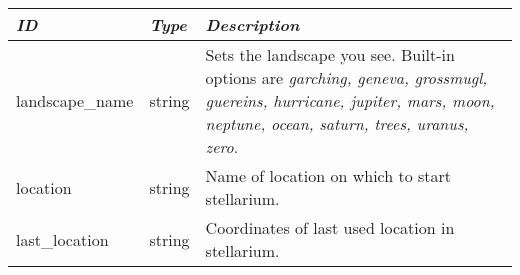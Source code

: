 \begin{longtabu} to \textwidth {l|l|X}\toprule
\emph{ID} & \emph{Type} & \emph{Description}\\\midrule
landscape\_name   & string & Sets the landscape you see. Built-in options are \emph{garching, geneva, grossmugl, guereins, 
                             hurricane, jupiter, mars, moon, neptune, ocean, saturn, trees, uranus, zero}.\\\midrule
location          & string & Name of location on which to start stellarium.\\\midrule
last\_location    & string & Coordinates of last used location in stellarium.\\\bottomrule
\end{longtabu}

\subsection{}\label{sec:config.ini:landscape}


